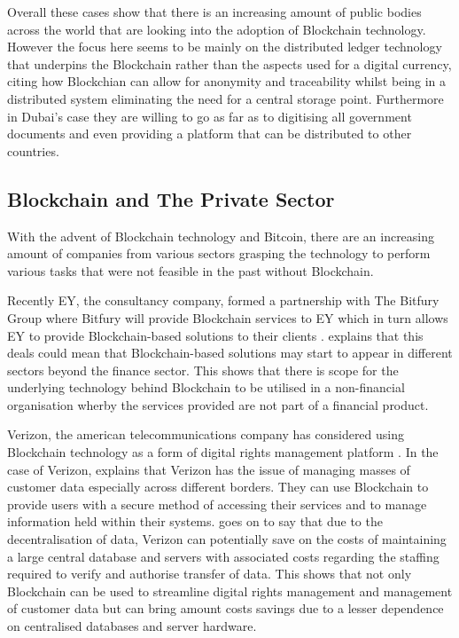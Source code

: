 \documentclass{article}
\begin{document}
\par
Overall these cases show that there is an increasing amount of public bodies across the world that are looking into the adoption of Blockchain technology. However the focus here seems to be mainly on the distributed ledger technology that underpins the Blockchain rather than the aspects used for a digital currency, citing how Blockchian can allow for anonymity and traceability whilst being in a distributed system eliminating the need for a central storage point. Furthermore in Dubai's case they are willing to go as far as to digitising all government documents and even providing a platform that can be distributed to other countries.

\subsection{Blockchain and The Private Sector}
With the advent of Blockchain technology and Bitcoin, there are an increasing amount of companies from various sectors grasping the technology to perform various tasks that were not feasible in the past without Blockchain.
\par
Recently EY, the consultancy company, formed a partnership with The Bitfury Group where Bitfury will provide Blockchain services to EY which in turn allows EY to provide Blockchain-based solutions to their clients \parencite{eyblockchain}. \textcite{eyblockchain} explains that this deals could mean that Blockchain-based solutions may start to appear in different sectors beyond the finance sector. This shows that there is scope for the underlying technology behind Blockchain to be utilised in a non-financial organisation wherby the services provided are not part of a financial product.
\par
Verizon, the american telecommunications company has considered using Blockchain technology as a form of digital rights management platform \parencite{verizonblockchain}. In the case of Verizon, \textcite{verizonblockchain} explains that Verizon has the issue of managing masses of customer data especially across different borders. They can use Blockchain to provide users with a secure method of accessing their services and to manage information held within their systems. \textcite{verizonblockchain} goes on to say that due to the decentralisation of data, Verizon can potentially save on the costs of maintaining a large central database and servers with associated costs regarding the staffing required to verify and authorise transfer of data. This shows that not only Blockchain can be used to streamline digital rights management and management of customer data but can bring amount costs savings due to a lesser dependence on centralised databases and server hardware.
\end{document}
